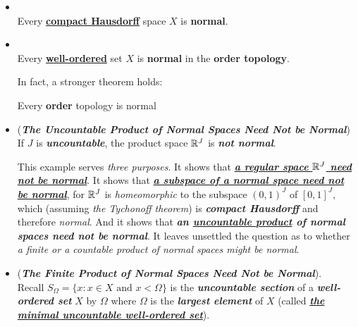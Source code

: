 \documentclass[11pt]{article}
\begin{document}
\begin{itemize}
\item \begin{theorem} \citep{munkres2000topology, reed1980methods}\\
Every \underline{\textbf{compact Hausdorff}} space $X$ is \textbf{normal}.
\end{theorem}

\item \begin{theorem} \citep{munkres2000topology}\\
Every \underline{\textbf{well-ordered}} set $X$ is \textbf{normal} in the \textbf{order topology}.
\end{theorem}

In fact, a stronger theorem holds:
\begin{theorem}
Every \textbf{order} topology is normal
\end{theorem}

\item \begin{example} (\emph{\textbf{The Uncountable Product of Normal Spaces Need Not be Normal}})\\ 
If $J$ is \emph{\textbf{uncountable}}, the product space ${\mathbb R}^{J}$ is \emph{\textbf{not normal}}.  

This example serves \emph{three purposes}. It shows that \underline{\emph{\textbf{a regular space ${\mathbb R}^{J}$ need not be normal}}}. It shows that \underline{\emph{\textbf{a subspace of a normal space need not be normal}}}, for ${\mathbb R}^{J}$ is \emph{homeomorphic} to the subspace $(0, 1)^J$ of $[0, 1]^J$, which (assuming \emph{the Tychonoff theorem}) is \emph{\textbf{compact Hausdorff}} and therefore \emph{normal}. And it shows that \emph{\textbf{an \underline{uncountable product} of normal spaces need not be normal}}. It leaves unsettled the question as to whether \emph{a finite or a countable product of normal spaces might be normal}.
\end{example}

\item \begin{example} (\emph{\textbf{The Finite Product of Normal Spaces Need Not be Normal}}).\\
Recall $S_{\Omega} = \{x: x\in X \text{ and } x < \Omega\}$ is the \emph{\textbf{uncountable section}} of a \emph{\textbf{well-ordered set}} $X$ by $\Omega$ where $\Omega$ is the \emph{\textbf{largest element}} of $X$ (called \underline{\emph{\textbf{the minimal uncountable well-ordered set}}}).


\end{example}
\end{itemize}
\end{document}

